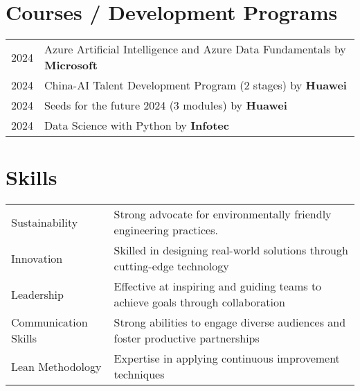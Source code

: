 \documentclass[a4paper,12pt]{article}
\begin{document}
\section{Courses / Development Programs}
\begin{tabularx}{\linewidth}{@{}l X@{}}	
2024 & Azure Artificial Intelligence and Azure Data Fundamentals by \textbf{Microsoft} \hfill  \\

2024 & China-AI Talent Development Program (2 stages) by \textbf{Huawei} \hfill \\ 

2024 & Seeds for the future 2024 (3 modules) by \textbf{Huawei} \hfill \\

2024 & Data Science with Python by \textbf{Infotec} \hfill \\
\end{tabularx}

\section{Skills}
\begin{tabularx}{\linewidth}{@{}l X@{}}
Sustainability &  \normalsize{Strong advocate for environmentally friendly engineering practices.}\\
Innovation  &  \normalsize{Skilled in designing real-world solutions through cutting-edge technology}\\   
Leadership &  \normalsize{Effective at inspiring and guiding teams to achieve goals through collaboration}\\    
Communication Skills  &  \normalsize{Strong abilities to engage diverse audiences and foster productive partnerships}\\  
Lean Methodology  &  \normalsize{Expertise in applying continuous improvement techniques}\\  
\end{tabularx}
\end{document}
